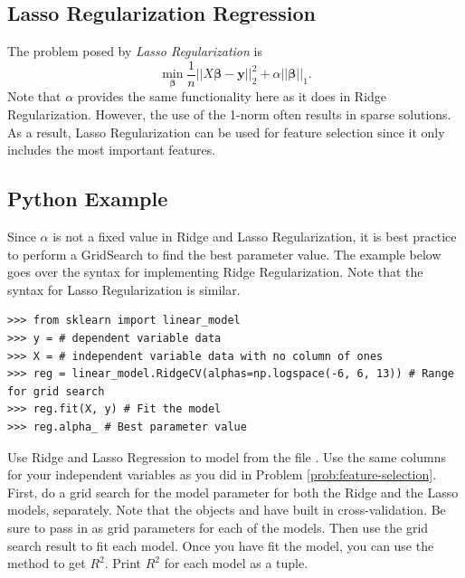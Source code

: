 \subsection*{Lasso Regularization Regression}
The problem posed by \textit{Lasso Regularization} is \[ \min_{\boldsymbol\beta} \frac{1}{n} \vert\vert X\boldsymbol\beta - \boldsymbol y \vert\vert_2^2 + \alpha \vert\vert \boldsymbol\beta \vert\vert_1. \]
Note that $\alpha$ provides the same functionality here as it does in Ridge Regularization. However, the use of the 1-norm often results in sparse solutions.
As a result, Lasso Regularization can be used for feature selection since it only includes the most important features.

\subsection*{Python Example}
Since $\alpha$ is not a fixed value in Ridge and Lasso Regularization, it is best practice to perform a GridSearch to find the best parameter value.
The example below goes over the syntax for implementing Ridge Regularization. Note that the syntax for Lasso Regularization is similar.

\begin{lstlisting}
>>> from sklearn import linear_model
>>> y = # dependent variable data
>>> X = # independent variable data with no column of ones
>>> reg = linear_model.RidgeCV(alphas=np.logspace(-6, 6, 13)) # Range for grid search
>>> reg.fit(X, y) # Fit the model
>>> reg.alpha_ # Best parameter value
\end{lstlisting}


\begin{problem}
Use Ridge and Lasso Regression to model  from the file .
Use the same columns for your independent variables as you did in Problem \ref{prob:feature-selection}.
First, do a grid search for the model parameter for both the Ridge and the Lasso models, separately.
Note that the objects  and  have built in cross-validation.
Be sure to pass in  as grid parameters for each of the models.
Then use the grid search result to fit each model.
Once you have fit the model, you can use the  method to get $R^2$.
Print $R^2$ for each model as a tuple.
\end{problem}






